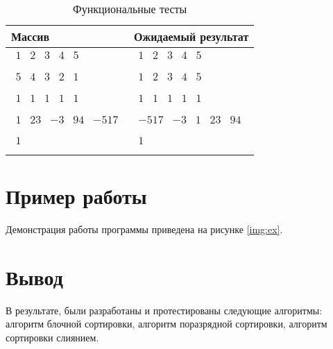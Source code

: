 \begin{table}[h]
	\caption{\label{tabular:functional_test} Функциональные тесты}
	\begin{tabularx}{\textwidth}{|X|X|}
		\hline   
		\centering \textbf{Массив} & \centering \textbf{Ожидаемый результат} \tabularnewline
		\hline
		\centering
		$\begin{matrix}
			1 & 2 & 3 & 4 & 5\\
		\end{matrix}$ &
		\centering
		$\begin{matrix}
			1 & 2 & 3 & 4 & 5\\
		\end{matrix}$\tabularnewline
		\hline
		\centering
		$\begin{matrix}
			5 & 4 & 3 & 2 & 1\\
		\end{matrix}$ &
		\centering
		$\begin{matrix}
			1 & 2 & 3 & 4 & 5\\
		\end{matrix}$\tabularnewline
		\hline
		\centering
		$\begin{matrix}
			1 & 1 & 1 & 1 & 1\\
		\end{matrix}$ &
		\centering
		$\begin{matrix}
			1 & 1 & 1 & 1 & 1\\
		\end{matrix}$\tabularnewline
		\hline
		\centering
		$\begin{matrix}
			1 & 23 & -3 & 94 & -517\\
		\end{matrix}$ &
		\centering
		$\begin{matrix}
			-517 & -3 & 1 & 23 & 94\\
		\end{matrix}$\tabularnewline
		\hline
		\centering
		$\begin{matrix}
			1\\
		\end{matrix}$ &
		\centering
		$\begin{matrix}
			1\\
		\end{matrix}$\tabularnewline
		\hline
	\end{tabularx}
\end{table}


\pagebreak

\section{Пример работы}

Демонстрация работы программы приведена на рисунке \ref{img:ex}.


\section*{Вывод}

В результате, были разработаны и протестированы следующие алгоритмы: алгоритм блочной сортировки, алгоритм поразрядной сортировки, алгоритм сортировки слиянием.